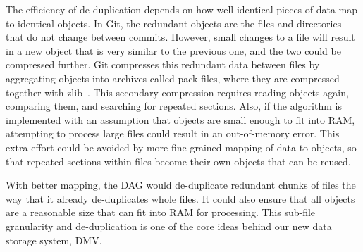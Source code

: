 The efficiency of de-duplication depends on how well identical pieces of data map to identical objects.
In Git, the redundant objects are the files and directories that do not change between commits.
However, small changes to a file will result in a new object that is very similar to the previous one, and the two could be compressed further.
Git compresses this redundant data between files by aggregating objects into archives called pack files, where they are compressed together with zlib~\cite[Section 10.4]{git_book}.
This secondary compression requires reading objects again, comparing them, and searching for repeated sections.
Also, if the algorithm is implemented with an assumption that objects are small enough to fit into RAM, attempting to process large files could result in an out-of-memory error.
This extra effort could be avoided by more fine-grained mapping of data to objects, so that repeated sections within files become their own objects that can be reused.

With better mapping, the DAG would de-duplicate redundant chunks of files the way that it already de-duplicates whole files.
It could also ensure that all objects are a reasonable size that can fit into RAM for processing.
This sub-file granularity and de-duplication is one of the core ideas behind our new data storage system, \acrlong{DMV}.


%
